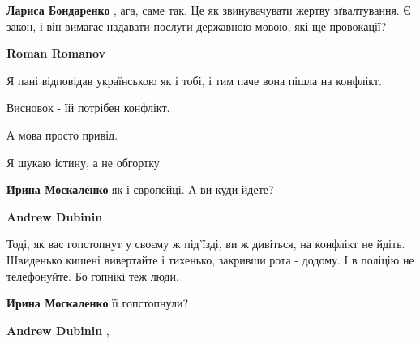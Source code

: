 \begin{itemize}
\begin{itemize}
\textbf{Лариса Бондаренко} , ага, саме так. Це як звинувачувати жертву
зґвалтування. Є закон, і він вимагає надавати послуги державною мовою, які ще
провокації?

 
\textbf{Roman Romanov} 

Я пані відповідав українською як і тобі, і тим паче вона пішла на конфлікт.

Висновок - їй потрібен конфлікт.

А мова просто привід.

Я шукаю істину, а не обгортку

 
\textbf{Ирина Москаленко} як і європейці.
А ви куди йдете?

 
\textbf{Andrew Dubinin} 

Тоді, як вас гопстопнут у своєму ж під'їзді, ви ж дивіться, на конфлікт не
йдіть. Швиденько кишені вивертайте і тихенько, закривши рота - додому. І в
поліцію не телефонуйте. Бо гопнікі теж люди.

 
\textbf{Ирина Москаленко} її гопстопнули?

 
\textbf{Andrew Dubinin} , 


\end{itemize}
\end{itemize}
